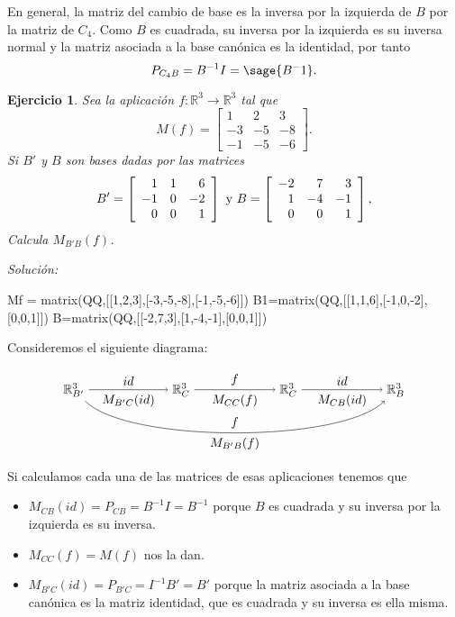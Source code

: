 \documentclass{amsart}
\newtheorem{ejer}{Ejercicio}
\def\r{\mathbb{R}}
\begin{document}
En general, la matriz del cambio de base es la inversa por la izquierda de
$B$ por la matriz de $C_4$. Como $B$ es cuadrada, su inversa por la izquierda
es su inversa normal y la matriz asociada a la base canónica es la identidad,
por tanto $$P_{C_4B} = B^{-1} I = \sage{B^-1}.$$



\begin{ejer} Sea la aplicación $f: \r ^3\to \r ^3$ tal que 
\[ M(f) = \left[ \begin{array}{rrr} 1 & 2 & 3\\ -3 & -5 & -8\\ 
-1 & -5 & -6 \end{array} \right]. \] Si $B'$ y $B$ son bases 
dadas por las matrices 
\[ B' = \left[ \begin{array}{rrr} 1 & 1 & 6\\ -1 & 0 & -2\\ 
0 & 0 & 1 \end{array} \right] \ \hbox{y} \ B = 
\left[ \begin{array}{rrr} -2 & 7 & 3\\ 1 & -4 & -1\\ 
0 & 0 & 1 \end{array} \right],  \] Calcula $M_{B'B}(f)$.
\end{ejer}

{\it Soluci\'on:}

\begin{sageblock}
Mf = matrix(QQ,[[1,2,3],[-3,-5,-8],[-1,-5,-6]])
B1=matrix(QQ,[[1,1,6],[-1,0,-2],[0,0,1]])
B=matrix(QQ,[[-2,7,3],[1,-4,-1],[0,0,1]])
\end{sageblock}

Consideremos el siguiente diagrama:

$$
\begin{tikzpicture}[xscale = 1.5]
\node (RBp) at (0,0) {$\r^3_{B'}$};
\node (RCa) at (2,0) {$\r^3_C$};
\node (RCb) at (4,0) {$\r^3_C$};
\node (RB)  at (6,0) {$\r^3_B$};
\draw[->] (RBp) to node [above] {$id$} 
                   node [below] {$M_{B'C}(id)$} (RCa);
\draw[->] (RCa) to node [above] {$f$} node [below] {$M_{CC}(f)$} (RCb); 
\draw[->] (RCb) to node [above] {$id$} node [below] {$M_{CB}(id)$} (RB);
\draw[->] (RBp) .. controls (1,-1.5) and (5,-1.5) .. 
                   node [above] {$f$} 
                   node [below] {$M_{B'B}(f)$} (RB);
\end{tikzpicture}
$$

Si calculamos cada una de las matrices de esas aplicaciones tenemos que
\begin{itemize}
\item $M_{CB}(id) = P_{CB} = B^{-1}I = B^{-1}$ porque $B$ es cuadrada
y su inversa por la izquierda es su inversa.
\item $M_{CC}(f) = M(f)$ nos la dan.
\item $M_{B'C}(id) = P_{B'C} = I^{-1}B'= B'$ porque la matriz asociada a la
base canónica es la matriz identidad, que es cuadrada y su inversa 
es ella misma. 
\end{itemize}
\end{document}
